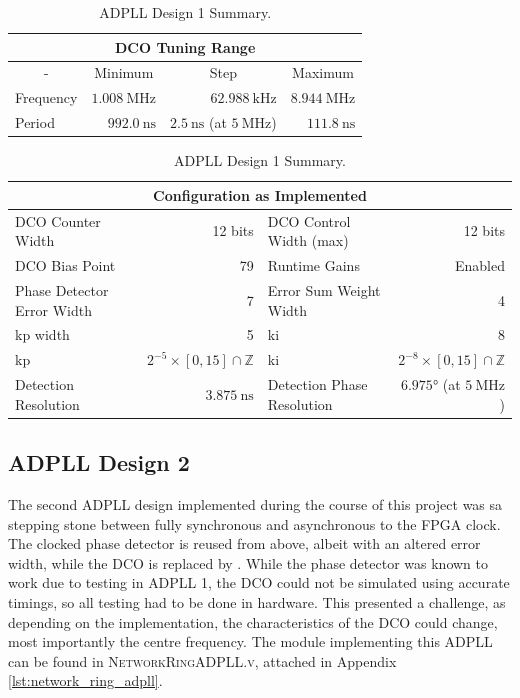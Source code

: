 \begin{table}[!h]
    \begin{center}
        \begin{tabular}{|l|r|r|r|}
            \multicolumn{4}{c}{\ac{DCO} Tuning Range} \T\\
            \hline
            \multicolumn{1}{|c|}{-} & \multicolumn{1}{c|}{Minimum} & \multicolumn{1}{c|}{Step} & \multicolumn{1}{c|}{Maximum} \T\\
            \hline
            Frequency & $1.008~\si{\mega\hertz}$ & \multicolumn{1}{r|}{$62.988~\si{\kilo\hertz}$} & $8.944~\si{\mega\hertz}$ \T\\
            \hline
            Period & $992.0~\si{\nano\second}$ & \multicolumn{1}{r|}{$2.5~\si{\nano\second}$ (at $5~\si{\mega\hertz}$)} & $111.8~\si{\nano\second}$ \T\\
            \hline
        \end{tabular}
        \begin{tabular}{|l|r|l|r|}
            \multicolumn{4}{c}{Configuration as Implemented} \T\\
            \hline
            \ac{DCO} Counter Width & 12 bits & \ac{DCO} Control Width (max) & 12 bits \T\\
            \hline
            \ac{DCO} Bias Point & 79 & Runtime Gains & Enabled \T\\
            \hline
            Phase Detector Error Width & 7 & Error Sum Weight Width & 4 \T\\
            \hline
            \acs{kp} width & 5 & \acs{ki} & 8 \T\\
            \hline
            \acs{kp} & $2^{-5}\times[0,15]\cap\mathbb{Z}$ & \acs{ki} & $2^{-8}\times[0,15]\cap\mathbb{Z}$ \T\\
            \hline
            Detection Resolution & $3.875~\si{\nano\second}$ & Detection Phase Resolution & $6.975\si{\degree}$ (at $5~\si{\mega\hertz}$)\\
            \hline
        \end{tabular}
    \end{center}
\caption[ADPLL Design 1 Summary]{ADPLL Design 1 Summary.}
\label{table:adpll1}
\end{table}

\subsection{\acs{ADPLL} Design 2}
The second \ac{ADPLL} design implemented during the course of this project was sa stepping stone between fully synchronous and asynchronous to the \ac{FPGA} clock. The clocked phase detector is reused from above, albeit with an altered error width, while the \ac{DCO} is replaced by . While the phase detector was known to work due to testing in \ac{ADPLL} 1, the \ac{DCO} could not be simulated using accurate timings, so all testing had to be done in hardware. This presented a challenge, as depending on the implementation, the characteristics of the \ac{DCO} could change, most importantly the centre frequency. The module implementing this \ac{ADPLL} can be found in \textsc{NetworkRingADPLL.v}, attached in Appendix \ref{lst:network_ring_adpll}.

